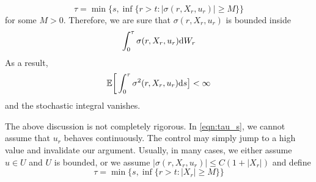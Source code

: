 \documentclass[11pt]{book}
\newcommand{\ds}{\text{\normalfont d}s}
\newcommand{\dW}{\text{\normalfont d}W}
\begin{document}
\begin{equation}\label{eqn:tau_s}
    \tau=\min\Big\{s,\inf\{r>t: |\sigma(r,X_r,u_r)|\ge M \}\Big\}
\end{equation}
for some $M>0$. Therefore, we are sure that  $\sigma(r,X_r,u_r)$ is bounded inside
\[
\int_0^\tau \sigma(r,X_r,u_r)\dW_r
\]
As a result, 
\[
\mathbb{E}\bigg[\int_0^\tau \sigma^2(r,X_r,u_r)\ds\big]<\infty
\]
and the stochastic integral vanishes. 
\begin{rem}
    The above discussion is not completely rigorous. In \eqref{eqn:tau_s}, we cannot assume that $u_r$ behaves continuously. The control may simply jump to a high value and invalidate our argument. Usually, in many cases, we either assume $u\in U$ and $U$ is bounded, or we assume $|\sigma(r,X_r,u_r)|\le C(1+|X_r|)$ and define 
    \[
    \tau=\min\Big\{s,\inf\{r>t: |X_r|\ge M \}\Big\}
    \]
\end{rem}
\end{document}
